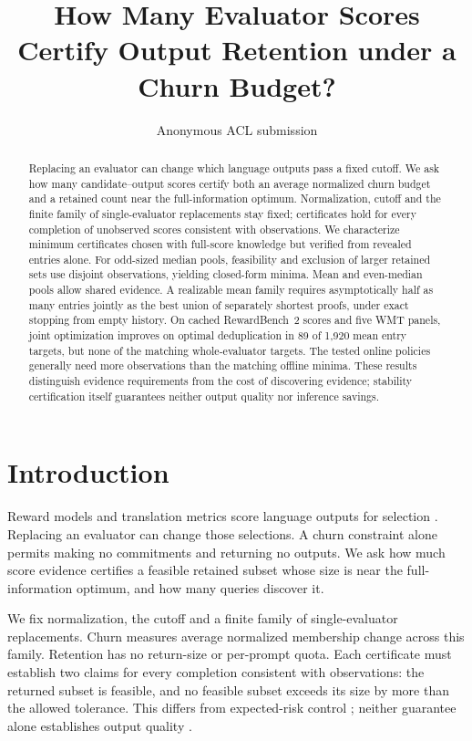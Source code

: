 \documentclass[11pt]{article}
\title{How Many Evaluator Scores Certify Output Retention under a Churn Budget?}
\author{Anonymous ACL submission}
\begin{document}
\maketitle
\begin{abstract}
Replacing an evaluator can change which language outputs pass a fixed cutoff. We ask how many candidate--output scores certify both an average normalized churn budget and a retained count near the full-information optimum. Normalization, cutoff and the finite family of single-evaluator replacements stay fixed; certificates hold for every completion of unobserved scores consistent with observations. We characterize minimum certificates chosen with full-score knowledge but verified from revealed entries alone. For odd-sized median pools, feasibility and exclusion of larger retained sets use disjoint observations, yielding closed-form minima. Mean and even-median pools allow shared evidence. A realizable mean family requires asymptotically half as many entries jointly as the best union of separately shortest proofs, under exact stopping from empty history. On cached RewardBench~2 scores and five WMT panels, joint optimization improves on optimal deduplication in 89 of 1,920 mean entry targets, but none of the matching whole-evaluator targets. The tested online policies generally need more observations than the matching offline minima. These results distinguish evidence requirements from the cost of discovering evidence; stability certification itself guarantees neither output quality nor inference savings.
\end{abstract}

\section{Introduction}
Reward models and translation metrics score language outputs for selection \citep{malik2026rewardbench2,freitag2023wmt23,zheng2023judging}. Replacing an evaluator can change those selections. A churn constraint alone permits making no commitments and returning no outputs. We ask how much score evidence certifies a feasible retained subset whose size is near the full-information optimum, and how many queries discover it.

We fix normalization, the cutoff and a finite family of single-evaluator replacements. Churn measures average normalized membership change across this family. Retention has no return-size or per-prompt quota. Each certificate must establish two claims for every completion consistent with observations: the returned subset is feasible, and no feasible subset exceeds its size by more than the allowed tolerance. This differs from expected-risk control \citep{angelopoulos2024crc,bai2026score}; neither guarantee alone establishes output quality \citep{eisenstein2024herding}.
\end{document}
